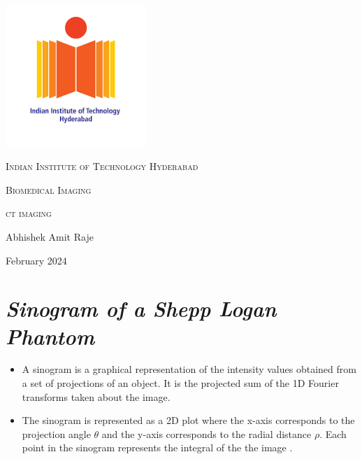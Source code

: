 \documentclass{article}
\begin{document}
\begin{titlepage}
  \centering
  \includegraphics[width=0.4\textwidth]{iithlogo.png}\par\vspace{1cm}
  {\scshape\LARGE Indian Institute of Technology Hyderabad \par}
  \vspace{1cm}
  {\scshape\Large Biomedical Imaging\par}
  \vspace{1.5cm}
\end{titlepage}

\begin{center}
  {\scshape\LARGE ct imaging \par}
  \vspace{0.5cm}
  {\Large Abhishek Amit Raje \par}
  \vspace{0.5cm}
  {\large February 2024 \par}
\end{center}
\newpage
\section{\textit{Sinogram of a Shepp Logan Phantom}}
\begin{itemize}
    \item A sinogram is a graphical representation of the intensity values obtained from a set of projections of an object. It is the projected sum of the 1D Fourier transforms taken about the image.
    \item The sinogram is represented as a 2D plot where the x-axis corresponds to the projection angle $\theta$ and the y-axis corresponds to the radial distance $\rho$. Each point in the sinogram represents the integral of the the image .
\end{itemize}
\end{document}

